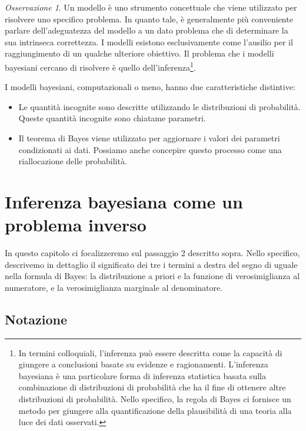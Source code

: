 \documentclass[
  11pt,
]{krantz}
\providecommand{\tightlist}{%
  \setlength{\itemsep}{0pt}\setlength{\parskip}{0pt}}
\theoremstyle{definition}
\theoremstyle{definition}
\theoremstyle{definition}
\theoremstyle{definition}
\theoremstyle{remark}
\newtheorem*{remark}{Osservazione}
\begin{document}
\begin{remark}
Un modello è uno strumento concettuale che viene utilizzato per risolvere uno specifico problema. In quanto tale, è generalmente più conveniente parlare dell'adeguatezza del modello a un dato problema che di determinare la sua intrinseca correttezza. I modelli esistono esclusivamente come l'ausilio per il raggiungimento di un qualche ulteriore obiettivo. Il problema che i modelli bayesiani cercano di risolvere è quello dell'inferenza\footnote{In termini colloquiali, l'inferenza può essere descritta come la capacità di giungere a conclusioni basate su evidenze e ragionamenti. L'inferenza bayesiana è una particolare forma di inferenza statistica basata sulla combinazione di distribuzioni di probabilità che ha il fine di ottenere altre distribuzioni di probabilità. Nello specifico, la regola di Bayes ci fornisce un metodo per giungere alla quantificazione della plausibilità di una teoria alla luce dei dati osservati.}.
\end{remark}

I modelli bayesiani, computazionali o meno, hanno due caratteristiche distintive:

\begin{itemize}
\tightlist
\item
  Le quantità incognite sono descritte utilizzando le distribuzioni di probabilità. Queste quantità incognite sono chiatame parametri.
\item
  Il teorema di Bayes viene utilizzato per aggiornare i valori dei parametri condizionati ai dati. Possiamo anche concepire questo processo come una riallocazione delle probabilità.
\end{itemize}

\hypertarget{inferenza-bayesiana-come-un-problema-inverso}{%
\section{Inferenza bayesiana come un problema inverso}\label{inferenza-bayesiana-come-un-problema-inverso}}

In questo capitolo ci focalizzeremo sul passaggio 2 descritto sopra. Nello specifico, descrivemo in dettaglio il significato dei tre i termini a destra del segno di uguale nella formula di Bayes: la distribuzione a priori e la funzione di verosimiglianza al numeratore, e la verosimiglianza marginale al denominatore.

\hypertarget{notazione}{%
\subsection{Notazione}\label{notazione}}
\end{document}
